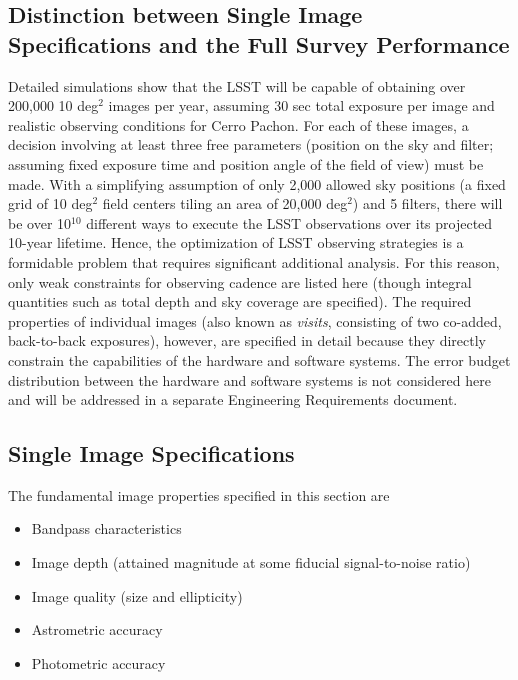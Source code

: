 \subsection{Distinction between Single Image Specifications and the
                        Full Survey Performance}


Detailed simulations show that the LSST will be capable of obtaining over
200,000 10 deg$^2$ images per year, assuming 30 sec total exposure per
image and realistic observing conditions for Cerro Pachon. For each of
these images, a decision involving at least three free
parameters (position on the sky and filter; assuming fixed exposure time
and position angle of the field of view) must be made. With a
simplifying assumption of only 2,000 allowed sky positions (\ie a
fixed grid of 10 deg$^2$ field centers tiling an area of 20,000 deg$^2$)
and 5 filters, there will be over 10$^{10}$ different ways to execute the
LSST observations over its projected 10-year lifetime. Hence, the
optimization of LSST observing strategies is a formidable problem that
requires significant additional analysis. For this reason, only weak
constraints for observing cadence are listed here (though integral
quantities such as total depth and sky coverage are specified).
The required properties of individual images (also known as {\it
visits}, consisting of two co-added, back-to-back exposures), however,
are specified
in detail because they directly constrain the capabilities of the hardware
and software systems. The error budget distribution between the hardware
and software systems is not considered here and will be addressed in a
separate Engineering Requirements document.



\subsection{              Single Image Specifications              }
\label{singleImageSpecs}


The fundamental image properties specified in this section are
\begin{itemize}
\item Bandpass characteristics
\item Image depth (attained magnitude at some fiducial signal-to-noise ratio)
\item Image quality (size and ellipticity)
\item Astrometric accuracy
\item Photometric accuracy
\end{itemize}


